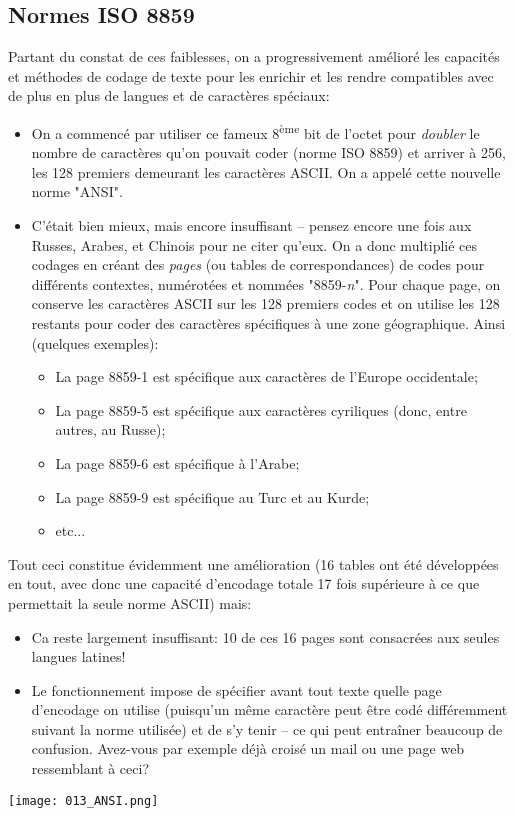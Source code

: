 \documentclass[12pt]{article}
\begin{document}
	\subsection{Normes ISO 8859}
	
	Partant du constat de ces faiblesses, on a progressivement amélioré les capacités et méthodes de codage de texte pour les enrichir et les rendre compatibles avec de plus en plus de langues et de caractères spéciaux:
	\begin{itemize}
		\item On a commencé par utiliser ce fameux 8\textsuperscript{ème} bit de l'octet pour \textit{doubler} le nombre de caractères qu'on pouvait coder (norme ISO 8859) et arriver à 256, les 128 premiers demeurant les caractères ASCII. On a appelé cette nouvelle norme "ANSI".
		\item C'était bien mieux, mais encore insuffisant -- pensez encore une fois aux Russes, Arabes, et Chinois pour ne citer qu'eux. On a donc multiplié ces codages en créant des \textit{pages} (ou tables de correspondances) de codes pour différents contextes, numérotées et nommées "8859-\textit{n}". Pour chaque page, on conserve les caractères ASCII sur les 128 premiers codes et on utilise les 128 restants pour coder des caractères spécifiques à une zone géographique. Ainsi (quelques exemples):
		\begin{itemize}
			\item La page 8859-1 est spécifique aux caractères de l'Europe occidentale;
			\item La page 8859-5 est spécifique aux caractères cyriliques (donc, entre autres, au Russe);
			\item La page 8859-6 est spécifique à l'Arabe;
			\item La page 8859-9 est spécifique au Turc et au Kurde;
			\item etc...
		\end{itemize} 
	\end{itemize}
	
	Tout ceci constitue évidemment une amélioration (16 tables ont été développées en tout, avec donc une capacité d'encodage totale 17 fois supérieure à ce que permettait la seule norme ASCII) mais:
	
	\begin{itemize}
		\item Ca reste largement insuffisant: 10 de ces 16 pages sont consacrées aux seules langues latines!
		\item Le fonctionnement impose de spécifier avant tout texte quelle page d'encodage on utilise (puisqu'un même caractère peut être codé différemment suivant la norme utilisée) et de s'y tenir -- ce qui peut entraîner beaucoup de confusion. Avez-vous par exemple déjà croisé un mail ou une page web ressemblant à ceci?
	\end{itemize}
	\begin{minipage}{0.95\textwidth}
		\centering
		\texttt{[image: 013\_ANSI.png]}
	\end{minipage}
	
\end{document}
